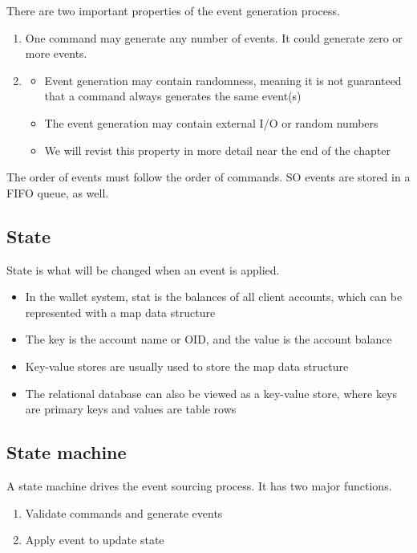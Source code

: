 \documentclass{report}
\theoremstyle{definition}
\let\oldsubsection\subsection
\renewcommand{\subsection}{\oldsubsection*}
\begin{document}
There are two important properties of the event generation process.

\begin{enumerate}
\item
One command may generate any number of events. It could generate zero or more events.
\item

\begin{itemize}
\item
Event generation may contain randomness, meaning it is not guaranteed that a command always generates the same event(s)
\item
The event generation may contain external I/O or random numbers
\item
We will revist this property in more detail near the end of the chapter
\end{itemize}
\end{enumerate}

The order of events must follow the order of commands. SO events are stored in a FIFO queue, as well.

\subsection{State}

State is what will be changed when an event is applied.

\begin{itemize}
\item
In the wallet system, stat is the balances of all client accounts, which can be represented with a map data structure
\item
The key is the account name or OID, and the value is the account balance
\item
Key-value stores are usually used to store the map data structure
\item
The relational database can also be viewed as a key-value store, where keys are primary keys and values are table rows
\end{itemize}

\subsection{State machine}

A state machine drives the event sourcing process. It has two major functions.

\begin{enumerate}
\item
Validate commands and generate events
\item
Apply event to update state
\end{enumerate}
\end{document}
